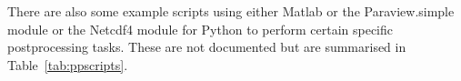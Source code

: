 \documentclass[11pt]{article}
\begin{document}
There are also some example scripts using either Matlab or the Paraview.simple module or the Netcdf4 module
for Python to perform certain specific postprocessing tasks.
These are not documented but are summarised in Table~\ref{tab:ppscripts}. 










\end{document}
